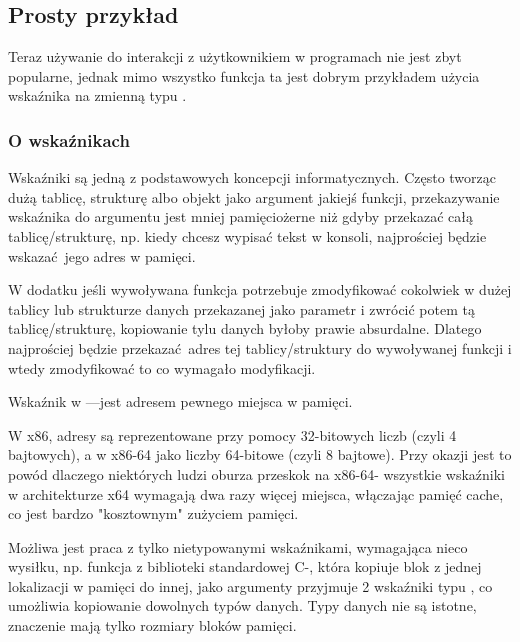 \subsection{Prosty przykład}



Teraz używanie \scanf do interakcji z użytkownikiem w programach nie jest zbyt popularne, jednak mimo wszystko funkcja ta jest dobrym przykładem użycia wskaźnika na zmienną typu  \Tint.

\subsubsection{O wskaźnikach}
\myindex{\CLanguageElements!\Pointers}

Wskaźniki są jedną z podstawowych koncepcji informatycznych. Często tworząc dużą tablicę, strukturę albo objekt jako argument jakiejś funkcji, przekazywanie wskaźnika do argumentu jest mniej pamięciożerne niż gdyby przekazać całą tablicę/strukturę, np. kiedy chcesz wypisać tekst w konsoli, najprościej będzie wskazać jego adres w pamięci.

W dodatku jeśli wywoływana funkcja potrzebuje zmodyfikować cokolwiek w dużej tablicy lub strukturze danych przekazanej jako parametr i zwrócić potem tą tablicę/strukturę, kopiowanie tylu danych byłoby prawie absurdalne. Dlatego najprościej będzie przekazać adres tej tablicy/struktury do wywoływanej funkcji i wtedy zmodyfikować to co wymagało modyfikacji.

Wskaźnik w \CCpp---jest adresem pewnego miejsca w pamięci.

W x86, adresy są reprezentowane przy pomocy 32-bitowych liczb (czyli 4 bajtowych), a w x86-64 jako liczby 64-bitowe (czyli 8 bajtowe). Przy okazji jest to powód dlaczego niektórych ludzi oburza przeskok na x86-64- wszystkie wskaźniki w architekturze x64 wymagają dwa razy więcej miejsca, włączając pamięć cache, co jest bardzo "kosztownym" zużyciem pamięci.

Możliwa jest praca z tylko nietypowanymi wskaźnikami, wymagająca nieco wysiłku, np. funkcja z biblioteki standardowej C-, która kopiuje blok z jednej lokalizacji w pamięci do innej, jako argumenty przyjmuje 2 wskaźniki typu , co umożliwia kopiowanie dowolnych typów danych. Typy danych nie są istotne, znaczenie mają tylko rozmiary bloków pamięci.

